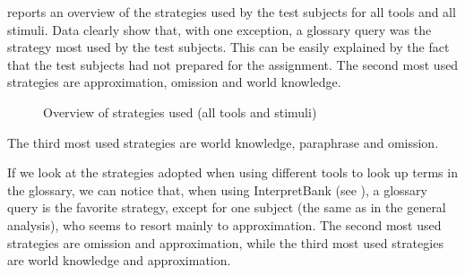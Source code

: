 \documentclass[output=paper]{langsci/langscibook}
\begin{document}
 reports an overview of the strategies used by the test subjects for all tools and all stimuli. Data clearly show that, with one exception, a glossary query was the strategy most used by the test subjects. This can be easily explained by the fact that the test subjects had not prepared for the assignment. The second most used strategies are approximation, omission and world knowledge.

\begin{figure}
\caption{Overview of strategies used (all tools and stimuli)
\label{fig:prandi:15}
}
\end{figure}
The third most used strategies are world knowledge, paraphrase and omission.

If we look at the strategies adopted when using different tools to look up terms in the glossary, we can notice that, when using InterpretBank (see ), a glossary query is the favorite strategy, except for one subject (the same as in the general analysis), who seems to resort mainly to approximation. The second most used strategies are omission and approximation, while the third most used strategies are world knowledge and approximation.
\end{document}
